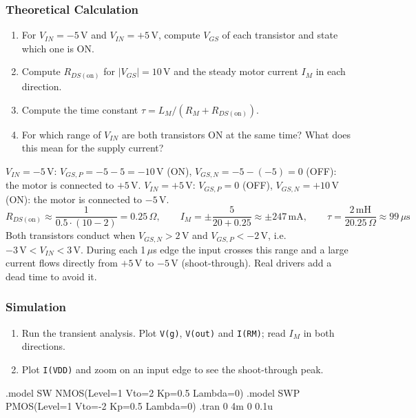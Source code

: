 \subsubsection*{Theoretical Calculation}
\begin{enumerate}[itemsep=2pt]
  \item For $V_{IN} = -5$\,V and $V_{IN} = +5$\,V, compute $V_{GS}$ of each transistor and state which one is ON.
  \item Compute $R_{DS(\mathrm{on})}$ for $|V_{GS}| = 10$\,V and the steady motor current $I_M$ in each direction.
  \item Compute the time constant $\tau = L_M/(R_M + R_{DS(\mathrm{on})})$.
  \item For which range of $V_{IN}$ are both transistors ON at the same time? What does this mean for the supply current?
\end{enumerate}
\begin{solution}
$V_{IN} = -5$\,V: $V_{GS,P} = -5-5 = -10$\,V (ON), $V_{GS,N} = -5-(-5) = 0$ (OFF): the motor is connected to $+5$\,V.
$V_{IN} = +5$\,V: $V_{GS,P} = 0$ (OFF), $V_{GS,N} = +10$\,V (ON): the motor is connected to $-5$\,V.
\[
  R_{DS(\mathrm{on})} \approx \frac{1}{0.5\cdot(10-2)} = 0.25\,\Omega,\qquad
  I_M = \pm\frac{5}{20+0.25} \approx \pm 247\,\mathrm{mA},\qquad
  \tau = \frac{2\,\mathrm{mH}}{20.25\,\Omega} \approx 99\,\mu\mathrm{s}
\]
Both transistors conduct when $V_{GS,N} > 2$\,V and $V_{GS,P} < -2$\,V, i.e.\ $-3\,\mathrm{V} < V_{IN} < 3\,\mathrm{V}$.
During each 1\,$\mu$s edge the input crosses this range and a large current flows directly from $+5$\,V to $-5$\,V
(shoot-through). Real drivers add a dead time to avoid it.
\end{solution}

\subsubsection*{Simulation}
\begin{enumerate}[itemsep=2pt]
  \item Run the transient analysis. Plot \texttt{V(g)}, \texttt{V(out)} and \texttt{I(RM)}; read $I_M$ in both directions.
  \item Plot \texttt{I(VDD)} and zoom on an input edge to see the shoot-through peak.
\end{enumerate}
\begin{spice}
.model SW  NMOS(Level=1 Vto=2  Kp=0.5 Lambda=0)
.model SWP PMOS(Level=1 Vto=-2 Kp=0.5 Lambda=0)
.tran 0 4m 0 0.1u
\end{spice}

